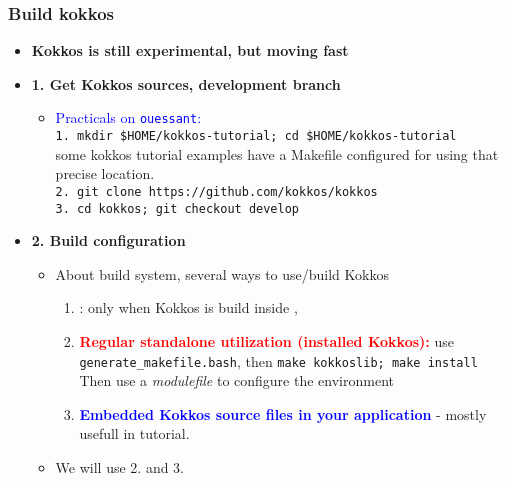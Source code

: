 \begin{frame}
  \frametitle{Build kokkos}

  \begin{itemize}
  \item \textbf{Kokkos is still experimental, but moving fast}
  \item \textbf{1. Get Kokkos sources, development branch}
    \begin{itemize}
    \item \textcolor{blue}{Practicals on \texttt{ouessant}:}\\
      \texttt{1. mkdir \$HOME/kokkos-tutorial; cd \$HOME/kokkos-tutorial}\\
      some kokkos tutorial examples have a Makefile configured for using that precise location.\\
      \texttt{2. git clone https://github.com/kokkos/kokkos}\\
      \texttt{3. cd kokkos; git checkout develop}
    \end{itemize}
  \item \textbf{2. Build configuration}
    \begin{itemize}
    \item About build system, several ways to use/build Kokkos
      \begin{enumerate}
      \item {}: only when Kokkos is build inside ,
      \item \textcolor{red}{\textbf{Regular standalone utilization (installed Kokkos):}} use \texttt{generate\_makefile.bash}, then \texttt{make kokkoslib; make install}\\
        Then use a \textit{modulefile} to configure the environment
      \item \textcolor{blue}{\textbf{Embedded Kokkos source files in your application}} - mostly usefull in tutorial.
      \end{enumerate}
      \item We will use 2. and 3.
    \end{itemize}
  \end{itemize}
 
\end{frame}

